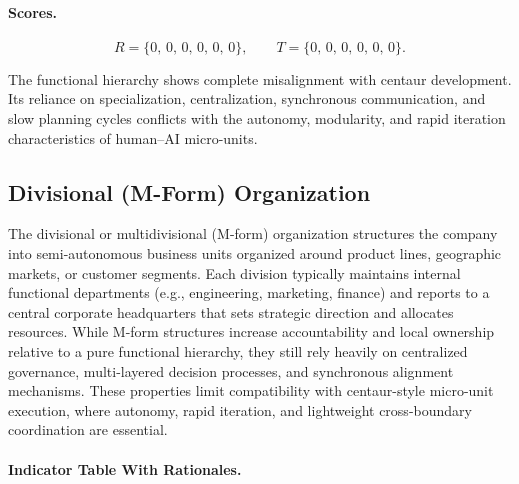 \documentclass[11pt, a4paper, twocolumn]{article} %
\begin{document}
\paragraph{Scores.}

\[
R = \{0,\,0,\,0,\,0,\,0,\,0\},
\qquad
T = \{0,\,0,\,0,\,0,\,0,\,0\}.
\]

The functional hierarchy shows complete misalignment with centaur development.
Its reliance on specialization, centralization, synchronous communication, and
slow planning cycles conflicts with the autonomy, modularity, and rapid iteration
characteristics of human--AI micro-units.

\newpage
\subsection*{Divisional (M-Form) Organization}

The divisional or multidivisional (M-form) organization structures the company
into semi-autonomous business units organized around product lines, geographic
markets, or customer segments. Each division typically maintains internal
functional departments (e.g., engineering, marketing, finance) and reports to a
central corporate headquarters that sets strategic direction and allocates
resources. While M-form structures increase accountability and local ownership
relative to a pure functional hierarchy, they still rely heavily on centralized
governance, multi-layered decision processes, and synchronous alignment
mechanisms. These properties limit compatibility with centaur-style micro-unit
execution, where autonomy, rapid iteration, and lightweight cross-boundary
coordination are essential.

\paragraph{Indicator Table With Rationales.}
\end{document}
